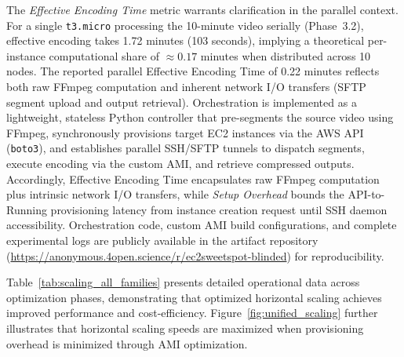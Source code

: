 \documentclass[conference]{IEEEtran}
\begin{document}
The \textit{Effective Encoding Time} metric warrants clarification in the
parallel context. For a single \texttt{t3.micro} processing the 10-minute
video serially (Phase~3.2), effective encoding takes 1.72 minutes (103
seconds), implying a theoretical per-instance computational share of
$\approx 0.17$ minutes when distributed across 10 nodes. The reported parallel
Effective Encoding Time of 0.22 minutes reflects both raw FFmpeg computation
and inherent network I/O transfers (SFTP segment upload and output retrieval).
Orchestration is implemented as a lightweight, stateless Python controller that
pre-segments the source video using FFmpeg, synchronously provisions target
EC2 instances via the AWS API (\texttt{boto3}), and establishes parallel
SSH/SFTP tunnels to dispatch segments, execute encoding via the custom AMI, and
retrieve compressed outputs. Accordingly, Effective Encoding Time encapsulates
raw FFmpeg computation plus intrinsic network I/O transfers, while
\textit{Setup Overhead} bounds the API-to-Running provisioning latency from
instance creation request until SSH daemon accessibility. Orchestration code,
custom AMI build configurations, and complete experimental logs are publicly
available in the artifact repository (\url{https://anonymous.4open.science/r/ec2sweetspot-blinded}) for
reproducibility.

Table~\ref{tab:scaling_all_families} presents detailed operational data across
optimization phases, demonstrating that optimized horizontal scaling achieves
improved performance and cost-efficiency.
Figure~\ref{fig:unified_scaling} further illustrates that horizontal scaling
speeds are maximized when provisioning overhead is minimized through AMI
optimization.
\end{document}
